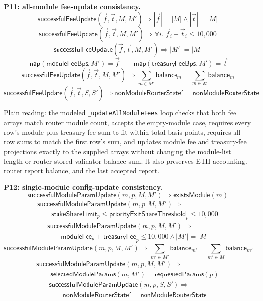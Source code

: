 \medskip
\noindent\textbf{P11: all-module fee-update consistency.}
\[
  \mathsf{successfulFeeUpdate}(\vec{f},\vec{t},M,M')
  \Rightarrow
  |\vec{f}| = |M| \land |\vec{t}| = |M|
\]
\[
  \mathsf{successfulFeeUpdate}(\vec{f},\vec{t},M,M')
  \Rightarrow
  \forall i.\ \vec{f}_i + \vec{t}_i \leq 10{,}000
\]
\[
  \mathsf{successfulFeeUpdate}(\vec{f},\vec{t},M,M')
  \Rightarrow
  |M'| = |M|
\]
\[
  \mathsf{map}(\mathsf{moduleFeeBps},M') = \vec{f}
  \qquad
  \mathsf{map}(\mathsf{treasuryFeeBps},M') = \vec{t}
\]
\[
  \mathsf{successfulFeeUpdate}(\vec{f},\vec{t},M,M')
  \Rightarrow
  \sum_{m\in M'}\mathsf{balance}_m = \sum_{m\in M}\mathsf{balance}_m
\]
\[
  \mathsf{successfulFeeUpdate}(\vec{f},\vec{t},S,S')
  \Rightarrow
  \mathsf{nonModuleRouterState}' = \mathsf{nonModuleRouterState}
\]

\noindent Plain reading: the modeled \texttt{\_updateAllModuleFees} loop checks
that both fee arrays match router module count, accepts the empty-module case,
requires every row's module-plus-treasury fee sum to fit within total basis
points, requires all row sums to match the first row's sum, and updates module
fee and treasury-fee projections exactly to the supplied arrays without
changing the module-list length or router-stored validator-balance sum. It also
preserves ETH accounting, router report balance, and the last accepted report.

\medskip
\noindent\textbf{P12: single-module config-update consistency.}
\[
  \mathsf{successfulModuleParamUpdate}(m,p,M,M')
  \Rightarrow
  \mathsf{existsModule}(m)
\]
\[
  \begin{array}{l}
  \mathsf{successfulModuleParamUpdate}(m,p,M,M')
  \Rightarrow \\
  \qquad
  \mathsf{stakeShareLimit}_p
  \leq
  \mathsf{priorityExitShareThreshold}_p
  \leq
  10{,}000
  \end{array}
\]
\[
  \begin{array}{l}
  \mathsf{successfulModuleParamUpdate}(m,p,M,M')
  \Rightarrow \\
  \qquad
  \mathsf{moduleFee}_p+\mathsf{treasuryFee}_p \leq 10{,}000
  \land |M'|=|M|
  \end{array}
\]
\[
  \mathsf{successfulModuleParamUpdate}(m,p,M,M')
  \Rightarrow
  \sum_{m'\in M'}\mathsf{balance}_{m'} = \sum_{m'\in M}\mathsf{balance}_{m'}
\]
\[
  \begin{array}{l}
  \mathsf{successfulModuleParamUpdate}(m,p,M,M')
  \Rightarrow \\
  \qquad
  \mathsf{selectedModuleParams}(m,M')
  = \mathsf{requestedParams}(p)
  \end{array}
\]
\[
  \begin{array}{l}
  \mathsf{successfulModuleParamUpdate}(m,p,S,S')
  \Rightarrow \\
  \qquad
  \mathsf{nonModuleRouterState}' = \mathsf{nonModuleRouterState}
  \end{array}
\]

